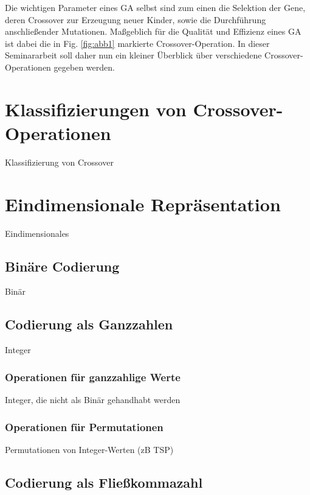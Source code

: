 \documentclass{llncs}
\begin{document}
	Die wichtigen Parameter eines GA selbst sind zum einen die Selektion der Gene, deren Crossover zur Erzeugung neuer Kinder, sowie die Durchführung anschließender Mutationen. Maßgeblich für die Qualität und Effizienz eines GA ist dabei die in Fig. \ref{fig:abb1} markierte Crossover-Operation. In dieser Seminararbeit soll daher nun ein kleiner Überblick über verschiedene Crossover-Operationen gegeben werden.

\section{Klassifizierungen von Crossover-Operationen}
\label{sec:KlassifizierungCrossover}

Klassifizierung von Crossover

\section{Eindimensionale Repräsentation}
\label{sec:EindimensionaleRep}

Eindimensionales

\subsection{Binäre Codierung}
\label{sec:BinCod}

Binär

\subsection{Codierung als Ganzzahlen}
\label{sec:IntCod}

Integer

\subsubsection{Operationen für ganzzahlige Werte}
\label{sec:IntOp}

Integer, die nicht als Binär gehandhabt werden

\subsubsection{Operationen für Permutationen}
\label{sec:PermOp}

Permutationen von Integer-Werten (zB TSP)

\subsection{Codierung als Fließkommazahl}
\label{sec:FloatCod}
\end{document}
